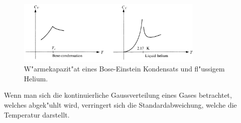 \begin{refsection}
\begin{figure}
    \centering
    \includegraphics[width = 0.8\textwidth]{./bose/wrmkap.jpg}
    \caption[W"armekapazit"at eines Bose-Einstein Kondensats und fl"ussigem Helium.]{W"armekapazit"at eines Bose-Einstein Kondensats und fl"ussigem Helium. \cite{bose:feynman}}
    \label{fig:WrmKap}
\end{figure}
Wenn man sich die kontinuierliche Gaussverteilung eines Gases betrachtet, welches abgek"uhlt wird, verringert sich die Standardabweichung, welche die Temperatur darstellt.


\end{refsection}
